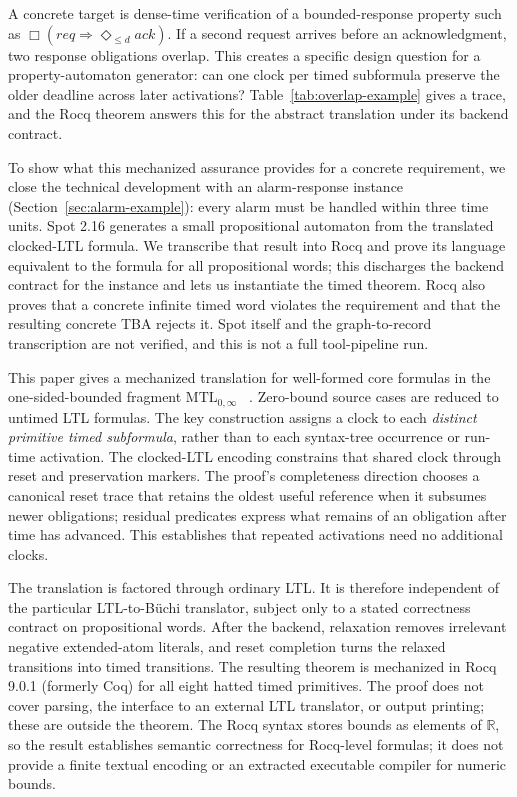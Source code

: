 \documentclass[10pt,journal,compsoc]{IEEEtran}
\newcommand{\Real}{\mathbb{R}}
\begin{document}
A concrete target is dense-time verification of a bounded-response property
such as $\Box(\mathit{req}\Rightarrow\Diamond_{\le d}\mathit{ack})$. If a
second request arrives before an acknowledgment, two response obligations
overlap. This creates a specific design question for a property-automaton
generator: can one clock per timed subformula preserve the older deadline
across later activations? Table~\ref{tab:overlap-example} gives a trace, and
the Rocq theorem answers this for the abstract translation under its backend
contract.

To show what this mechanized assurance provides for a concrete requirement,
we close the technical development with an alarm-response instance
(Section~\ref{sec:alarm-example}): every alarm must be handled within three
time units. Spot 2.16 generates a small propositional automaton from the
translated clocked-LTL formula. We transcribe that result into Rocq and prove
its language equivalent to the formula for all propositional words; this
discharges the backend contract for the instance and lets us instantiate the
timed theorem. Rocq also proves that a concrete infinite timed word violates
the requirement and that the resulting concrete TBA rejects it. Spot itself
and the graph-to-record transcription are not verified, and this is not a
full tool-pipeline run.

This paper gives a mechanized translation for well-formed core formulas in
the one-sided-bounded fragment $\mathrm{MTL}_{0,\infty}$~
\cite{[RK90],[RTH96],[BDLG14]}.
Zero-bound source cases are reduced to untimed LTL formulas. The key construction assigns a clock to each
\emph{distinct primitive timed subformula}, rather
than to each syntax-tree occurrence or run-time activation. The clocked-LTL
encoding constrains that shared clock through reset and preservation markers.
The proof's completeness direction chooses a canonical reset trace that
retains the oldest useful reference when it subsumes newer obligations;
residual predicates express what remains of an obligation after time has
advanced. This establishes that repeated activations need no additional
clocks.

The translation is factored through ordinary LTL. It is therefore independent
of the particular LTL-to-B\"uchi translator, subject only to a stated
correctness contract on propositional words. After the backend, relaxation
removes irrelevant negative extended-atom literals, and reset completion
turns the relaxed transitions into timed transitions. The resulting theorem is
mechanized in Rocq 9.0.1 (formerly Coq) for all eight hatted timed
primitives. The proof does not cover parsing, the
interface to an external LTL translator, or output printing; these are outside
the theorem. The Rocq syntax stores bounds as elements of $\Real$, so the result establishes
semantic correctness for Rocq-level formulas; it does not provide a finite
textual encoding or an extracted executable compiler for numeric bounds.
\end{document}
